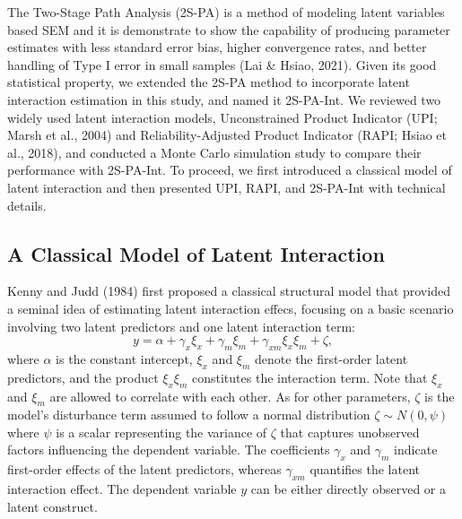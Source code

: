 \documentclass[
  man]{apa7}
\begin{document}
The Two-Stage Path Analysis (2S-PA) is a method of modeling latent variables based SEM and it is demonstrate to show the capability of producing parameter estimates with less standard error bias, higher convergence rates, and better handling of Type I error in small samples (Lai \& Hsiao, 2021). Given its good statistical property, we extended the 2S-PA method to incorporate latent interaction estimation in this study, and named it 2S-PA-Int. We reviewed two widely used latent interaction models, Unconstrained Product Indicator (UPI; Marsh et al., 2004) and Reliability-Adjusted Product Indicator (RAPI; Hsiao et al., 2018), and conducted a Monte Carlo simulation study to compare their performance with 2S-PA-Int. To proceed, we first introduced a classical model of latent interaction and then presented UPI, RAPI, and 2S-PA-Int with technical details.

\hypertarget{a-classical-model-of-latent-interaction}{%
\subsection{A Classical Model of Latent Interaction}\label{a-classical-model-of-latent-interaction}}

Kenny and Judd (1984) first proposed a classical structural model that provided a seminal idea of estimating latent interaction effecs, focusing on a basic scenario involving two latent predictors and one latent interaction term:
\begin{equation}
y = \alpha + \gamma_{x}\xi_{x} + \gamma_{m}\xi_{m} + \gamma_{xm}\xi_{x}\xi_{m} + \zeta,
\end{equation}
where \(\alpha\) is the constant intercept, \(\xi_{x}\) and \(\xi_{m}\) denote the first-order latent predictors, and the product \(\xi_{x}\xi_{m}\) constitutes the interaction term. Note that \(\xi_{x}\) and \(\xi_{m}\) are allowed to correlate with each other. As for other parameters, \(\zeta\) is the model's disturbance term assumed to follow a normal distribution \(\zeta \sim N(0, \psi)\) where \(\psi\) is a scalar representing the variance of \(\zeta\) that captures unobserved factors influencing the dependent variable. The coefficients \(\gamma_{x}\) and \(\gamma_{m}\) indicate first-order effects of the latent predictors, whereas \(\gamma_{xm}\) quantifies the latent interaction effect. The dependent variable \(y\) can be either directly observed or a latent construct.
\end{document}
